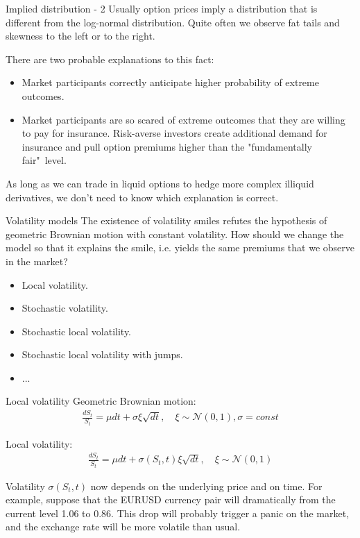 \documentclass{beamer}
\begin{document}
\begin{frame}{Implied distribution - 2}
\justify
Usually option prices imply a distribution that is different from the log-normal distribution. Quite often we observe fat tails and skewness to the left or to the right.

\justify
There are two probable explanations to this fact:
\begin{itemize}
\item Market participants correctly anticipate higher probability of extreme outcomes.
\item Market participants are so scared of extreme outcomes that they are willing to pay for insurance. Risk-averse investors create additional demand for insurance and pull option premiums higher than the "fundamentally fair"\ level.
\end{itemize}

\justify
As long as we can trade in liquid options to hedge more complex illiquid derivatives, we don't need to know which explanation is correct.
\end{frame}



\begin{frame}{Volatility models}
\justify
The existence of volatility smiles refutes the hypothesis of geometric Brownian motion with constant volatility. How should we change the model so that it explains the smile, i.e. yields the same premiums that we observe in the market?

\justify
\begin{itemize}
\item Local volatility.
\item Stochastic volatility.
\item Stochastic local volatility.
\item Stochastic local volatility with jumps.
\item ...
\end{itemize}
\end{frame}



\begin{frame}{Local volatility}
\justify
Geometric Brownian motion:
\begin{align*}
\frac{dS_t}{S_t} = \mu dt + \sigma\xi\sqrt{dt}, \quad \xi \sim \mathcal{N}(0, 1), \sigma = const
\end{align*}

\justify
Local volatility:
\begin{align*}
\frac{dS_t}{S_t} = \mu dt + \sigma(S_t, t)\xi\sqrt{dt}, \quad \xi \sim \mathcal{N}(0, 1)
\end{align*}

\justify
Volatility $\sigma(S_t, t)$ now depends on the underlying price and on time. For example, suppose that the EURUSD currency pair will dramatically from the current level 1.06 to 0.86. This drop will probably trigger a panic on the market, and the exchange rate will be more volatile than usual.
\end{frame}
\end{document}
